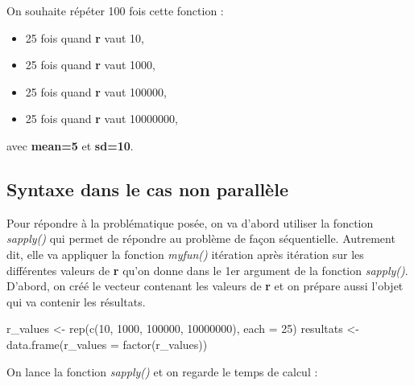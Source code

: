 \documentclass[
]{book}
\newenvironment{Shaded}{\begin{snugshade}}{\end{snugshade}}
\newcommand{\AttributeTok}[1]{\textcolor[rgb]{0.77,0.63,0.00}{#1}}
\newcommand{\CommentTok}[1]{\textcolor[rgb]{0.56,0.35,0.01}{\textit{#1}}}
\newcommand{\DecValTok}[1]{\textcolor[rgb]{0.00,0.00,0.81}{#1}}
\newcommand{\FunctionTok}[1]{\textcolor[rgb]{0.00,0.00,0.00}{#1}}
\newcommand{\NormalTok}[1]{#1}
\newcommand{\OtherTok}[1]{\textcolor[rgb]{0.56,0.35,0.01}{#1}}
\newcommand{\SpecialCharTok}[1]{\textcolor[rgb]{0.00,0.00,0.00}{#1}}
\providecommand{\tightlist}{%
  \setlength{\itemsep}{0pt}\setlength{\parskip}{0pt}}
\theoremstyle{definition}
\theoremstyle{definition}
\theoremstyle{definition}
\theoremstyle{definition}
\theoremstyle{remark}
\begin{document}
On souhaite répéter 100 fois cette fonction :

\begin{itemize}
\tightlist
\item
  25 fois quand \textbf{r} vaut 10,
\item
  25 fois quand \textbf{r} vaut 1000,
\item
  25 fois quand \textbf{r} vaut 100000,
\item
  25 fois quand \textbf{r} vaut 10000000,
\end{itemize}

avec \textbf{mean=5} et \textbf{sd=10}.

\hypertarget{syntaxe-dans-le-cas-non-paralluxe8le}{%
\subsection{Syntaxe dans le cas non parallèle}\label{syntaxe-dans-le-cas-non-paralluxe8le}}

Pour répondre à la problématique posée, on va d'abord utiliser la fonction \emph{sapply()} qui permet de répondre au problème de façon séquentielle. Autrement dit, elle va appliquer la fonction \emph{myfun()} itération après itération sur les différentes valeurs de \textbf{r} qu'on donne dans le 1er argument de la fonction \emph{sapply()}. D'abord, on créé le vecteur contenant les valeurs de \textbf{r} et on prépare aussi l'objet qui va contenir les résultats.

\begin{Shaded}
\begin{Highlighting}[]
\NormalTok{r\_values }\OtherTok{\textless{}{-}} \FunctionTok{rep}\NormalTok{(}\FunctionTok{c}\NormalTok{(}\DecValTok{10}\NormalTok{, }\DecValTok{1000}\NormalTok{, }\DecValTok{100000}\NormalTok{, }\DecValTok{10000000}\NormalTok{), }\AttributeTok{each =} \DecValTok{25}\NormalTok{)}
\NormalTok{resultats }\OtherTok{\textless{}{-}} \FunctionTok{data.frame}\NormalTok{(}\AttributeTok{r\_values =} \FunctionTok{factor}\NormalTok{(r\_values))}
\end{Highlighting}
\end{Shaded}

On lance la fonction \emph{sapply()} et on regarde le temps de calcul :

\begin{Shaded}
\end{Shaded}
\end{document}
